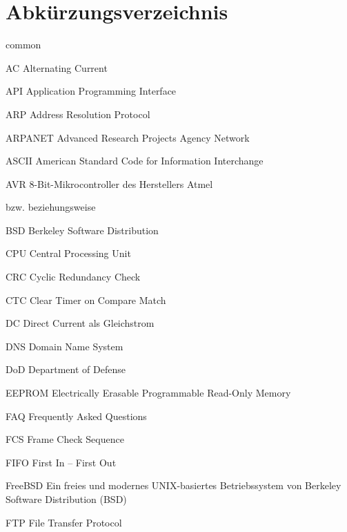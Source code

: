 
\tableofcontents
{}



\chapter*{Abkürzungsverzeichnis}

%
\begin{bfscript}{common}
	\item[AC] Alternating Current
	\item[API] Application Programming Interface
	\item[ARP] Address Resolution Protocol
	\item[ARPANET] Advanced Research Projects Agency Network
	\item[ASCII] American Standard Code for Information Interchange
	\item[AVR] 8-Bit-Mikrocontroller des Herstellers Atmel

	\item[bzw.] beziehungsweise
	\item[BSD] Berkeley Software Distribution

	\item[CPU] Central Processing Unit
	\item[CRC] Cyclic Redundancy Check
	\item[CTC] Clear Timer on Compare Match

	\item[DC] Direct Current als Gleichstrom
	\item[DNS] Domain Name System
	\item[DoD] Department of Defense

	\item[EEPROM] Electrically Erasable Programmable Read-Only Memory

	\item[FAQ] Frequently Asked Questions
	\item[FCS] Frame Check Sequence
	\item[FIFO] First In – First Out
	\item[FreeBSD] Ein freies und modernes UNIX-basiertes Betriebssystem von Berkeley Software Distribution (BSD)
	\item[FTP] File Transfer Protocol


\end{bfscript}
